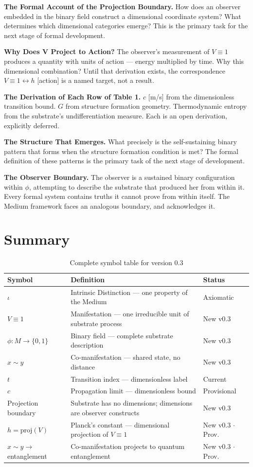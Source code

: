 \documentclass[11pt,letterpaper]{article}
\begin{document}
\textbf{The Formal Account of the Projection Boundary.} How does an observer embedded in the binary field construct a dimensional coordinate system? What determines which dimensional categories emerge? This is the primary task for the next stage of formal development.

\textbf{Why Does V Project to Action?} The observer's measurement of \(V \equiv 1\) produces a quantity with units of action --- energy multiplied by time. Why this dimensional combination? Until that derivation exists, the correspondence \(V \equiv 1 \leftrightarrow h\) {[}action] is a named target, not a result.

\textbf{The Derivation of Each Row of Table 1.} \(c\) {[}m/s] from the dimensionless transition bound. \(G\) from structure formation geometry. Thermodynamic entropy from the substrate's undifferentiation measure. Each is an open derivation, explicitly deferred.

\textbf{The Structure That Emerges.} What precisely is the self-sustaining binary pattern that forms when the structure formation condition is met? The formal definition of these patterns is the primary task of the next stage of development.

\textbf{The Observer Boundary.} The observer is a sustained binary configuration within \(\phi\), attempting to describe the substrate that produced her from within it. Every formal system contains truths it cannot prove from within itself. The Medium framework faces an analogous boundary, and acknowledges it.
\section{Summary}
\label{sec:orge02ca66}

\begin{table}[htbp]
\caption{Complete symbol table for version 0.3}
\centering
\begin{tabular}{llp{3cm}}
\toprule
\textbf{Symbol} & \textbf{Definition} & \textbf{Status}\\
\midrule
\(\iota\) & Intrinsic Distinction --- one property of the Medium & Axiomatic\\
\(V \equiv 1\) & Manifestation --- one irreducible unit of substrate process & New v0.3\\
\(\phi : M \to \{0,1\}\) & Binary field --- complete substrate description & New v0.3\\
\(x \sim y\) & Co-manifestation --- shared state, no distance & New v0.3\\
\(t\) & Transition index --- dimensionless label & Current\\
\(c\) & Propagation limit --- dimensionless bound & Provisional\\
Projection boundary & Substrate has no dimensions; dimensions are observer constructs & New v0.3\\
\(h = \mathrm{proj}(V)\) & Planck's constant --- dimensional projection of \(V \equiv 1\) & New v0.3 \(\cdot\) Prov.\\
\(x \sim y \to\) entanglement & Co-manifestation projects to quantum entanglement & New v0.3 \(\cdot\) Prov.\\
\bottomrule
\end{tabular}
\end{table}
\end{document}
